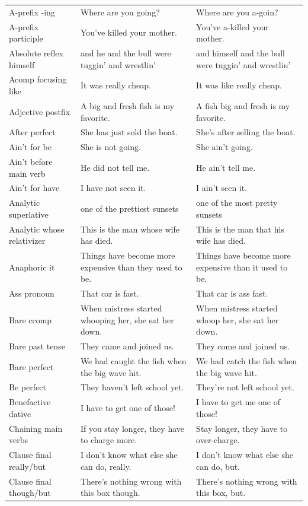 \begin{longtable}{
  >{\raggedright\arraybackslash}p{3.2cm}
  >{\raggedright\arraybackslash}p{4.8cm}
  >{\raggedright\arraybackslash}p{4.8cm}
}
A-prefix -ing & Where are you going? & Where are you a-goin? \\
A-prefix participle & You've killed your mother. & You've a-killed your mother. \\
Absolute reflex himself & and he and the bull were tuggin' and wrestlin' & and himself and the bull were tuggin' and wrestlin' \\
Acomp focusing like & It was really cheap. & It was like really cheap. \\
Adjective postfix & A big and fresh fish is my favorite. & A fish big and fresh is my favorite. \\
After perfect & She has just sold the boat. & She's after selling the boat. \\
Ain't for be & She is not going. & She ain't going. \\
Ain't before main verb & He did not tell me. & He ain't tell me. \\
Ain't for have & I have not seen it. & I ain't seen it. \\
Analytic superlative & one of the prettiest sunsets & one of the most pretty sunsets \\
Analytic whose relativizer & This is the man whose wife has died. & This is the man that his wife has died. \\
Anaphoric it & Things have become more expensive than they used to be. & Things have become more expensive than it used to be. \\
Ass pronoun & That car is fast. & That car is ass fast. \\
Bare ccomp & When mistress started whooping her, she sat her down. & When mistress started whoop her, she sat her down. \\
Bare past tense & They came and joined us. & They come and joined us. \\
Bare perfect & We had caught the fish when the big wave hit. & We had catch the fish when the big wave hit. \\
Be perfect & They haven't left school yet. & They're not left school yet. \\
Benefactive dative & I have to get one of those! & I have to get me one of those! \\
Chaining main verbs & If you stay longer, they have to charge more. & Stay longer, they have to over-charge. \\
Clause final really/but & I don't know what else she can do, really. & I don't know what else she can do, but. \\
Clause final though/but & There's nothing wrong with this box though. & There's nothing wrong with this box, but. \\

\end{longtable}

